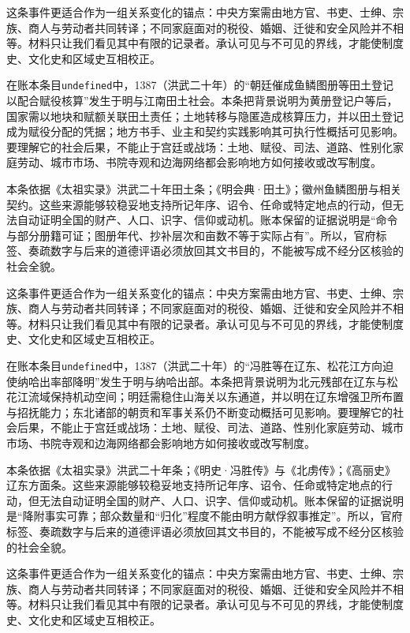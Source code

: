 这条事件更适合作为一组关系变化的锚点：中央方案需由地方官、书吏、士绅、宗族、商人与劳动者共同转译；不同家庭面对的税役、婚姻、迁徙和安全风险并不相等。材料只让我们看见其中有限的记录者。承认可见与不可见的界线，才能使制度史、文化史和区域史互相校正。

在账本条目\texttt{undefined}中，1387（洪武二十年）的“朝廷催成鱼鳞图册等田土登记以配合赋役核算”发生于明与江南田土社会。本条把背景说明为黄册登记户等后，国家需以地块和赋额关联田土责任；土地转移与隐匿造成核算压力，并以田土登记成为赋役分配的凭据；地方书手、业主和契约实践影响其可执行性概括可见影响。要理解它的社会后果，不能止于宫廷或战场：土地、赋役、司法、道路、性别化家庭劳动、城市市场、书院寺观和边海网络都会影响地方如何接收或改写制度。

本条依据《太祖实录》洪武二十年田土条；《明会典·田土》；徽州鱼鳞图册与相关契约。这些来源能够较稳妥地支持所记年序、诏令、任命或特定地点的行动，但无法自动证明全国的财产、人口、识字、信仰或动机。账本保留的证据说明是“命令与部分册籍可证；图册年代、抄补层次和亩数不等于实际占有”。所以，官府标签、奏疏数字与后来的道德评语必须放回其文书目的，不能被写成不经分区核验的社会全貌。

这条事件更适合作为一组关系变化的锚点：中央方案需由地方官、书吏、士绅、宗族、商人与劳动者共同转译；不同家庭面对的税役、婚姻、迁徙和安全风险并不相等。材料只让我们看见其中有限的记录者。承认可见与不可见的界线，才能使制度史、文化史和区域史互相校正。

在账本条目\texttt{undefined}中，1387（洪武二十年）的“冯胜等在辽东、松花江方向迫使纳哈出率部降明”发生于明与纳哈出部。本条把背景说明为北元残部在辽东与松花江流域保持机动空间；明廷需稳住山海关以东通道，并以明在辽东增强卫所布置与招抚能力；东北诸部的朝贡和军事关系仍不断变动概括可见影响。要理解它的社会后果，不能止于宫廷或战场：土地、赋役、司法、道路、性别化家庭劳动、城市市场、书院寺观和边海网络都会影响地方如何接收或改写制度。

本条依据《太祖实录》洪武二十年条；《明史·冯胜传》与《北虏传》；《高丽史》辽东方面条。这些来源能够较稳妥地支持所记年序、诏令、任命或特定地点的行动，但无法自动证明全国的财产、人口、识字、信仰或动机。账本保留的证据说明是“降附事实可靠；部众数量和“归化”程度不能由明方献俘叙事推定”。所以，官府标签、奏疏数字与后来的道德评语必须放回其文书目的，不能被写成不经分区核验的社会全貌。

这条事件更适合作为一组关系变化的锚点：中央方案需由地方官、书吏、士绅、宗族、商人与劳动者共同转译；不同家庭面对的税役、婚姻、迁徙和安全风险并不相等。材料只让我们看见其中有限的记录者。承认可见与不可见的界线，才能使制度史、文化史和区域史互相校正。

